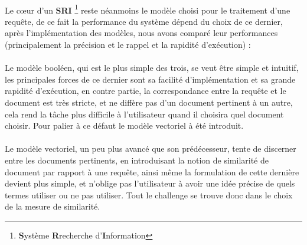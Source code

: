 \documentclass[12pt]{report}
\begin{document}
	\paragraph{}
	Le cœur d'un \textbf{SRI} \footnote{\textbf{S}ystème \textbf{R}recherche d'\textbf{I}nformation}
	reste néanmoins le modèle choisi pour le traitement d'une requête, de ce fait
	la performance du système dépend du choix de ce dernier, après l'implémentation
	des modèles, nous avons comparé leur performances (principalement la précision
	et le rappel et la rapidité d'exécution) :
	\paragraph{}
	Le modèle booléen, qui est le plus simple des trois, se veut être simple et
	intuitif, les principales forces de ce dernier sont sa facilité d'implémentation
	et sa grande rapidité d'exécution, en contre partie, la correspondance
	entre la requête et le document est très stricte, et ne diffère pas d'un 
	document pertinent à un autre, cela rend la tâche plus difficile à l'utilisateur
	quand il choisira quel document choisir. Pour palier à ce défaut le modèle 
	vectoriel à été introduit.
	\paragraph{}
	Le modèle vectoriel, un peu plus avancé que son prédécesseur, tente de discerner
	entre les documents pertinents, en introduisant la notion de similarité de
	document par rapport à une requête, ainsi même la formulation de cette dernière
	devient plus simple, et n'oblige pas l'utilisateur à avoir une idée précise de
	quels termes utiliser ou ne pas utiliser. Tout le challenge se trouve donc
	dans le choix de la mesure de similarité.
	
\end{document}
